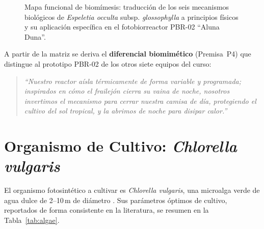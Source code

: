 \documentclass[conference]{IEEEtran}
\begin{document}
\begin{figure}[!t]
{%
}
\caption{Mapa funcional de biom\'imesis: traducci\'on de los seis mecanismos
biol\'ogicos de \textit{Espeletia occulta} subsp. \textit{glossophylla} a
principios f\'isicos y su aplicaci\'on espec\'ifica en el fotobiorreactor
PBR-02 ``Aluna Duna''.}
\label{fig:mapa}
\end{figure}

A partir de la matriz se deriva el \textbf{diferencial biomim\'etico}
(Premisa~P4) que distingue al prototipo PBR-02 de los otros siete equipos
del curso:

\begin{quote}
\textit{``Nuestro reactor a\'isla t\'ermicamente de forma variable y
programada; inspirados en c\'omo el frailej\'on cierra su vaina de noche,
nosotros invertimos el mecanismo para cerrar nuestra camisa de d\'ia, 
protegiendo el cultivo del sol tropical, y la abrimos de noche para disipar calor.''}
\end{quote}

\section{Organismo de Cultivo: \textit{Chlorella vulgaris}}

El organismo fotosint\'etico a cultivar es \textit{Chlorella vulgaris},
una microalga verde de agua dulce de 2--10\,\textmu m de di\'ametro
\cite{plants2019}. Sus par\'ametros \'optimos de cultivo, reportados de
forma consistente en la literatura, se resumen en la Tabla~\ref{tab:algae}.
\end{document}
